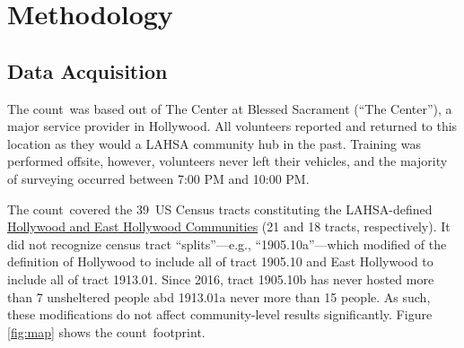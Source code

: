 \documentclass[11pt,twocolumn]{article}
\def\Count{count}
\def\ntracts{39}
\def\resp{respectively}
\begin{document}
\section{Methodology}
\label{sec:procedure}
%
%

\subsection{Data Acquisition}
\label{sec:acquisition}

The \Count\ was based out of The Center at Blessed Sacrament (``The Center''), a major service 
provider in Hollywood. All volunteers reported and returned to this location as they would a LAHSA 
community hub in the past. Training was performed offsite, however, volunteers
never left their vehicles, and the majority of surveying occurred between 7:00 PM and 10:00 PM.

The \Count\ covered the \ntracts\ US Census tracts constituting the LAHSA-defined 
\href{https://www.lahsa.org/data?id=45-2020-homeless-count-by-community-city}{Hollywood 
and East Hollywood Communities} (21 and 18 tracts, \resp). It did not recognize census 
tract ``splits''---e.g., ``1905.10a''---which modified of the definition of Hollywood to include 
all of tract 1905.10 and East Hollywood to include all of tract 1913.01. Since 2016, tract 1905.10b has 
never hosted more than 7 unsheltered people abd 1913.01a never more than 15 people. As such,
these modifications do not affect community-level results significantly.
Figure \ref{fig:map} shows the \Count\ footprint.
\end{document}
